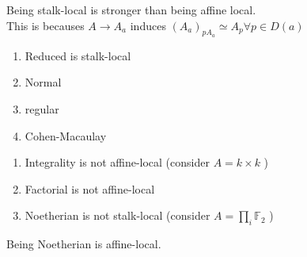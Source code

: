 \documentclass[../main.tex]{subfiles}
\begin{document}
\begin{rmq}
Being stalk-local is stronger than being affine local.\\
This is becauses $A\to A_a$ induces $( A_a)_{p A_a} \simeq A_p \forall p \in D( a) $ 
\end{rmq}
\begin{exemple}
\begin{enumerate}
\item Reduced is stalk-local
\item Normal
\item regular
\item Cohen-Macaulay
\end{enumerate}
\end{exemple}
\begin{exemple}
\begin{enumerate}
\item Integrality is not affine-local (consider $A= k\times k$ ) 
\item Factorial is not affine-local
\item Noetherian is not stalk-local (consider $A= \prod_{i} \mathbb{F}_2$ ) 
\end{enumerate}
\end{exemple}
\begin{lemma}
Being Noetherian is affine-local.
\end{lemma}
\end{document}
